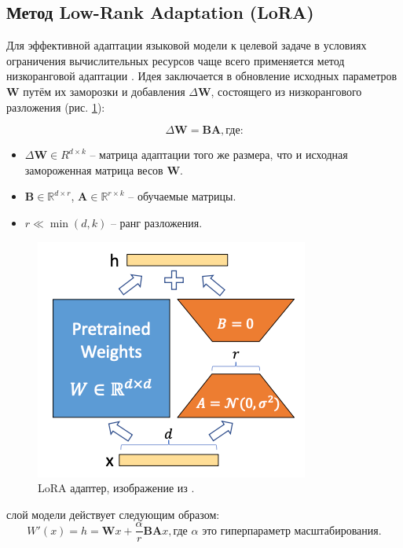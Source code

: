 \subsection{Метод Low-Rank Adaptation (LoRA)}
\label{subsec:lora} 

Для эффективной адаптации языковой модели к целевой задаче в условиях ограничения вычислительных ресурсов чаще всего применяется метод низкоранговой адаптации \cite{LoRA}. Идея заключается в обновление исходных параметров $\mathbf{W}$ путём их заморозки и добавления $\Delta \mathbf{W}$, состоящего из низкорангового разложения (рис. \ref{lora}):

\begin{equation}
    \Delta \mathbf{W} = \mathbf{B}\mathbf{A}, \textit{где:}
\end{equation}

\begin{itemize}
    \item $\Delta \mathbf{W} \in R^{d \times k}$ -- матрица адаптации того же размера, что и исходная замороженная матрица весов $\mathbf{W}$.
    \item $\mathbf{B} \in \mathbb{R}^{d \times r}$, $\mathbf{A} \in \mathbb{R}^{r \times k}$ -- обучаемые матрицы.
    \item $r \ll \min(d, k)$ -- ранг разложения.
\end{itemize}

\begin{figure}[ht!]
    \centering
    \includegraphics[scale=0.65]{images/lora_good.png}
    \caption{LoRA адаптер, изображение из \cite{LoRA}.}
    \label{lora}
\end{figure}

 слой модели действует следующим образом:
\begin{equation}
    W'(x) = h = \mathbf{W}x + \frac{\alpha}{r} \mathbf{B}\mathbf{A}x, \text{где $\alpha$ это гиперпараметр масштабирования.}
\end{equation}


